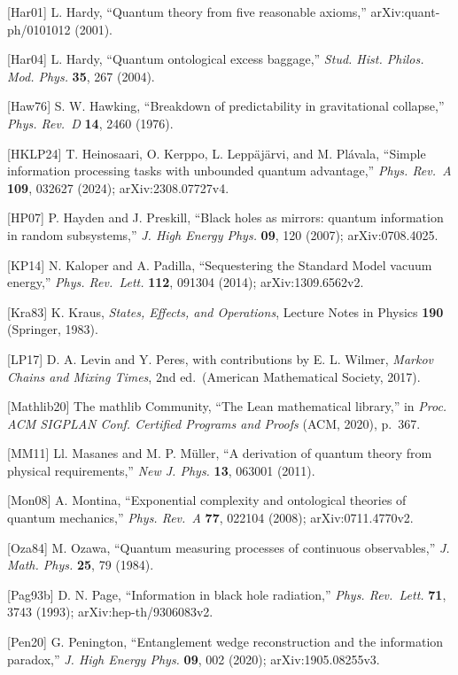 \documentclass[
]{article}
\begin{document}
{[}Har01{]} L. Hardy, ``Quantum theory from five reasonable axioms,''
arXiv:quant-ph/0101012 (2001).

{[}Har04{]} L. Hardy, ``Quantum ontological excess baggage,''
\emph{Stud. Hist. Philos. Mod. Phys.} \textbf{35}, 267 (2004).

{[}Haw76{]} S. W. Hawking, ``Breakdown of predictability in
gravitational collapse,'' \emph{Phys. Rev.~D} \textbf{14}, 2460 (1976).

{[}HKLP24{]} T. Heinosaari, O. Kerppo, L. Leppäjärvi, and M. Plávala,
``Simple information processing tasks with unbounded quantum
advantage,'' \emph{Phys. Rev.~A} \textbf{109}, 032627 (2024);
arXiv:2308.07727v4.

{[}HP07{]} P. Hayden and J. Preskill, ``Black holes as mirrors: quantum
information in random subsystems,'' \emph{J. High Energy Phys.}
\textbf{09}, 120 (2007); arXiv:0708.4025.

{[}KP14{]} N. Kaloper and A. Padilla, ``Sequestering the Standard Model
vacuum energy,'' \emph{Phys. Rev.~Lett.} \textbf{112}, 091304 (2014);
arXiv:1309.6562v2.

{[}Kra83{]} K. Kraus, \emph{States, Effects, and Operations}, Lecture
Notes in Physics \textbf{190} (Springer, 1983).

{[}LP17{]} D. A. Levin and Y. Peres, with contributions by E. L. Wilmer,
\emph{Markov Chains and Mixing Times}, 2nd ed.~(American Mathematical
Society, 2017).

{[}Mathlib20{]} The mathlib Community, ``The Lean mathematical
library,'' in \emph{Proc. ACM SIGPLAN Conf. Certified Programs and
Proofs} (ACM, 2020), p.~367.

{[}MM11{]} Ll. Masanes and M. P. Müller, ``A derivation of quantum
theory from physical requirements,'' \emph{New J. Phys.} \textbf{13},
063001 (2011).

{[}Mon08{]} A. Montina, ``Exponential complexity and ontological
theories of quantum mechanics,'' \emph{Phys. Rev.~A} \textbf{77}, 022104
(2008); arXiv:0711.4770v2.

{[}Oza84{]} M. Ozawa, ``Quantum measuring processes of continuous
observables,'' \emph{J. Math. Phys.} \textbf{25}, 79 (1984).

{[}Pag93b{]} D. N. Page, ``Information in black hole radiation,''
\emph{Phys. Rev.~Lett.} \textbf{71}, 3743 (1993);
arXiv:hep-th/9306083v2.

{[}Pen20{]} G. Penington, ``Entanglement wedge reconstruction and the
information paradox,'' \emph{J. High Energy Phys.} \textbf{09}, 002
(2020); arXiv:1905.08255v3.
\end{document}
